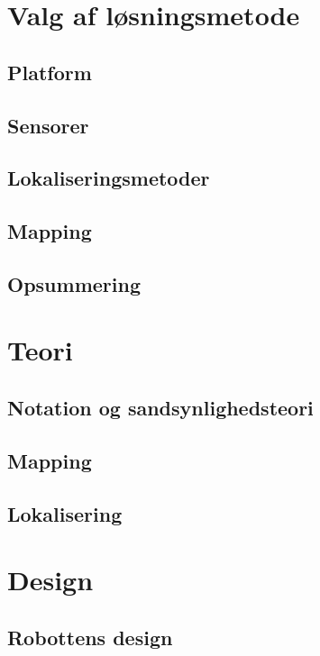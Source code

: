 \clearpage

\part{Valg af løsningsmetode}


\chapter{Platform}



\chapter{Sensorer}

\chapter{Lokaliseringsmetoder}

\chapter{Mapping}

\chapter{Opsummering}


\part{Teori}
\chapter{Notation og sandsynlighedsteori}

\chapter{Mapping}


\chapter{Lokalisering}



\part{Design}
\chapter{Robottens design}


